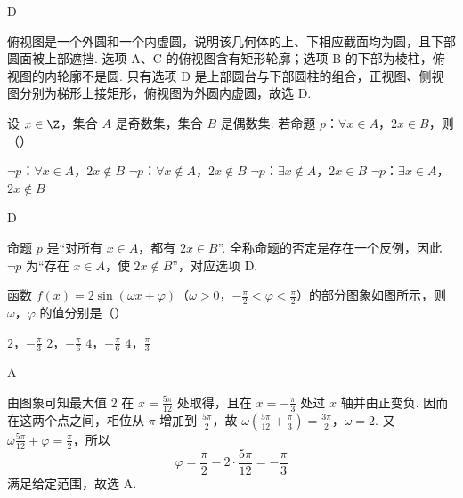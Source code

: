 \begin{answer}
D
\end{answer}

\begin{solution}
俯视图是一个外圆和一个内虚圆，说明该几何体的上、下相应截面均为圆，且下部圆面被上部遮挡. 选项 A、C 的俯视图含有矩形轮廓；选项 B 的下部为棱柱，俯视图的内轮廓不是圆. 只有选项 D 是上部圆台与下部圆柱的组合，正视图、侧视图分别为梯形上接矩形，俯视图为外圆内虚圆，故选 D.
\end{solution}

\begin{problem}
设 \(x \in \Z\)，集合 \(A\) 是奇数集，集合 \(B\) 是偶数集. 若命题 \(p\)：\(\forall x \in A\)，\(2x \in B\)，则（\quad）

\choices
    {\(\neg p\)：\(\forall x \in A\)，\(2x \notin B\)}
    {\(\neg p\)：\(\forall x \notin A\)，\(2x \notin B\)}
    {\(\neg p\)：\(\exists x \notin A\)，\(2x \in B\)}
    {\(\neg p\)：\(\exists x \in A\)，\(2x \notin B\)}
\end{problem}

\begin{answer}
D
\end{answer}

\begin{solution}
命题 \(p\) 是“对所有 \(x\in A\)，都有 \(2x\in B\)”. 全称命题的否定是存在一个反例，因此
\(\neg p\) 为“存在 \(x\in A\)，使 \(2x\notin B\)”，对应选项 D.
\end{solution}

\begin{problem}
函数 \( f(x) = 2\sin\left(\omega x + \varphi\right) \)（\(\omega > 0\)，\(-\frac{\pi}{2} < \varphi < \frac{\pi}{2}\)）的部分图象如图所示，则 \(\omega\)，\(\varphi\) 的值分别是（\quad）


\choices
    {\(2\)，\(-\frac{\pi}{3}\)}
    {\(2\)，\(-\frac{\pi}{6}\)}
    {\(4\)，\(-\frac{\pi}{6}\)}
    {\(4\)，\(\frac{\pi}{3}\)}
\end{problem}

\begin{answer}
A
\end{answer}

\begin{solution}
由图象可知最大值 \(2\) 在 \(x=\frac{5\pi}{12}\) 处取得，且在 \(x=-\frac{\pi}{3}\) 处过 \(x\) 轴并由正变负. 因而在这两个点之间，相位从 \(\pi\) 增加到 \(\frac{5\pi}{2}\)，故
\(\omega\left(\frac{5\pi}{12}+\frac{\pi}{3}\right)=\frac{3\pi}{2}\)，\(\omega=2\).
又 \(\omega\frac{5\pi}{12}+\varphi=\frac{\pi}{2}\)，所以
\[
\varphi=\frac{\pi}{2}-2\cdot\frac{5\pi}{12}=-\frac{\pi}{3}
\]
满足给定范围，故选 A.
\end{solution}

